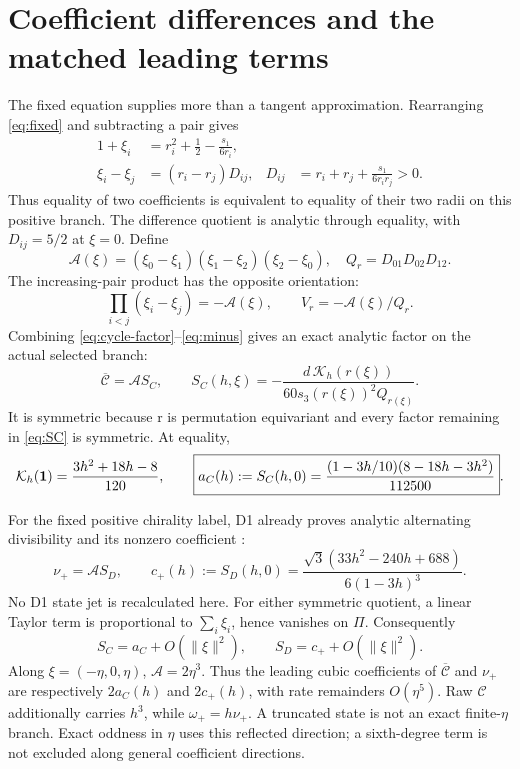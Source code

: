 \documentclass[11pt,a4paper]{article}
\numberwithin{equation}{section}
\theoremstyle{remark}\newtheorem{remark}[theorem]{Remark}
\newcommand{\calA}{\mathcal A}\newcommand{\calC}{\mathcal C}\newcommand{\Cbar}{\overline{\mathcal C}}
\begin{document}
\clearpage
\section{Coefficient differences and the matched leading terms}\label{sec:coefficients}
The fixed equation supplies more than a tangent approximation. Rearranging \eqref{eq:fixed} and subtracting a pair gives
\begin{align}
1+\xi_i&=r_i^2+\frac12-\frac{s_1}{6r_i},\label{eq:k-radius}\\
\xi_i-\xi_j&=(r_i-r_j)D_{ij},
&D_{ij}&=r_i+r_j+\frac{s_1}{6r_ir_j}>0.\label{eq:pair}
\end{align}
Thus equality of two coefficients is equivalent to equality of their two radii on this positive branch. The difference quotient is analytic through equality, with $D_{ij}=5/2$ at $\xi=0$. Define
\begin{equation}
\calA(\xi)=(\xi_0-\xi_1)(\xi_1-\xi_2)(\xi_2-\xi_0),
\quad Q_r=D_{01}D_{02}D_{12}.
\label{eq:A}
\end{equation}
The increasing-pair product has the opposite orientation:
\begin{equation}
\prod_{i<j}(\xi_i-\xi_j)=-\calA(\xi),\qquad V_r=-\calA(\xi)/Q_r.
\label{eq:minus}
\end{equation}
Combining \eqref{eq:cycle-factor}--\eqref{eq:minus} gives an exact analytic factor on the actual selected branch:
\begin{equation}
\boxed{\Cbar=\calA S_C,\qquad
S_C(h,\xi)=-\frac{d\,\mathcal K_h(r(\xi))}{60s_3(r(\xi))^2Q_{r(\xi)}}}.\label{eq:SC}
\end{equation}
It is symmetric because r is permutation equivariant and every factor remaining in \eqref{eq:SC} is symmetric. At equality,
\begin{equation}
\mathcal K_h(\mathbf1)=\frac{3h^2+18h-8}{120},\qquad
\boxed{a_C(h):=S_C(h,0)=\frac{(1-3h/10)(8-18h-3h^2)}{112500}}.
\label{eq:aC}
\end{equation}

For the fixed positive chirality label, D1 already proves analytic alternating divisibility and its nonzero coefficient \cite[D28--D30, D36--D37]{drift}:
\begin{equation}
\nu_+=\calA S_D,\qquad
\boxed{c_+(h):=S_D(h,0)=\frac{\sqrt3(33h^2-240h+688)}{6(1-3h)^3}}.
\label{eq:cD}
\end{equation}
No D1 state jet is recalculated here. For either symmetric quotient, a linear Taylor term is proportional to $\sum_i\xi_i$, hence vanishes on $\Pi$. Consequently
\begin{equation}
S_C=a_C+O(\|\xi\|^2),\qquad S_D=c_++O(\|\xi\|^2).
\label{eq:quotient-taylor}
\end{equation}
Along $\xi=(-\eta,0,\eta)$, $\calA=2\eta^3$. Thus the leading cubic coefficients of $\Cbar$ and $\nu_+$ are respectively $2a_C(h)$ and $2c_+(h)$, with rate remainders $O(\eta^5)$. Raw $\calC$ additionally carries $h^3$, while $\omega_+=h\nu_+$. A truncated state is not an exact finite-$\eta$ branch. Exact oddness in $\eta$ uses this reflected direction; a sixth-degree term is not excluded along general coefficient directions.
\end{document}
